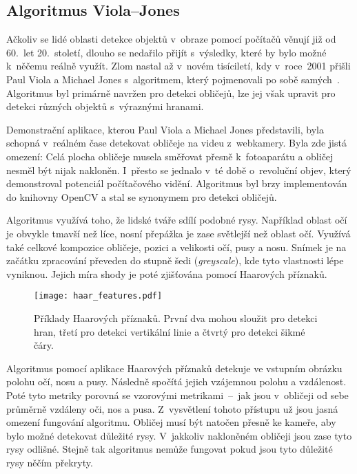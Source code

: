 
\subsection*{Algoritmus Viola--Jones}

Ačkoliv se lidé oblasti detekce objektů v~obraze pomocí počítačů věnují již od 60.~let 20.~století, dlouho se nedařilo přijít s~výsledky, které by bylo možné k~něčemu reálně využít. Zlom nastal až v~novém tisíciletí, kdy v~roce~2001 přišli Paul Viola a Michael Jones s~algoritmem, který pojmenovali po sobě samých~\cite{paperViolaJones}. Algoritmus byl primárně navržen pro detekci obličejů, lze jej však upravit pro detekci různých objektů s~výraznými hranami.

Demonstrační aplikace, kterou Paul Viola a Michael Jones představili, byla schopná v~reálném čase detekovat obličeje na videu z~webkamery. Byla zde jistá omezení: Celá plocha obličeje musela směřovat přesně k~fotoaparátu a obličej nesměl být nijak nakloněn. I~přesto se jednalo v~té době o~revoluční objev, který demonstroval potenciál počítačového vidění. Algoritmus byl brzy implementován do knihovny OpenCV a stal se synonymem pro detekci obličejů.

Algoritmus využívá toho, že lidské tváře sdílí podobné rysy. Například oblast očí je obvykle tmavší než líce, nosní přepážka je zase světlejší než oblast očí. Využívá také celkové kompozice obličeje, pozici a velikosti očí, pusy a nosu. Snímek je na začátku zpracování převeden do stupně šedi (\textit{greyscale}), kde tyto vlastnosti lépe vyniknou. Jejich míra shody je poté zjišťována pomocí Haarových příznaků.

\begin{figure}[H]
    \centering
    \texttt{[image: haar\_features.pdf]}
    \caption[Příklady Haarových příznaků]{Příklady Haarových příznaků. První dva mohou sloužit pro detekci hran, třetí pro detekci vertikální linie a čtvrtý pro detekci šikmé čáry.}
    \label{fig_haar_feature_1}
\end{figure}

Algoritmus pomocí aplikace Haarových příznaků detekuje ve vstupním obrázku polohu očí, nosu a pusy. Následně spočítá jejich vzájemnou polohu a vzdálenost. Poté tyto metriky porovná se vzorovými metrikami~--~jak jsou v~obličeji od sebe průměrně vzdáleny oči, nos a pusa. Z~vysvětlení tohoto přístupu už jsou jasná omezení fungování algoritmu. Obličej musí být natočen přesně ke kameře, aby bylo možné detekovat důležité rysy. V~jakkoliv nakloněném obličeji jsou zase tyto rysy odlišné. Stejně tak algoritmus nemůže fungovat pokud jsou tyto důležité rysy něčím překryty.

